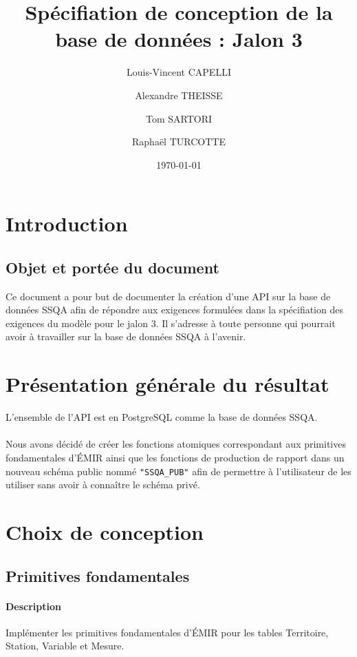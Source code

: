 \documentclass{article}
\begin{document}
\title{Spécifiation de conception de la base de données : Jalon 3}

\author{Louis-Vincent CAPELLI \and Alexandre THEISSE \and Tom SARTORI \and Raphaël TURCOTTE}
\date{\today}
\maketitle
\newpage

\tableofcontents
\newpage

\section{Introduction}
\subsection*{Objet et portée du document}
Ce document a pour but de documenter la création d'une API sur la base de données
SSQA afin de répondre aux exigences formulées dans la
spécifiation des exigences du modèle pour le jalon 3.
Il s'adresse à toute personne qui pourrait avoir à travailler sur la base de données
SSQA à l'avenir.

\section{Présentation générale du résultat}
L'ensemble de l'API est en PostgreSQL comme la base de données SSQA.
\\\\
Nous avons décidé de créer les fonctions atomiques correspondant aux primitives 
fondamentales d'ÉMIR ainsi que les fonctions de production de rapport
dans un nouveau schéma public nommé \texttt{"SSQA\_PUB"}
afin de permettre à l'utilisateur de les utiliser sans avoir à connaître le
schéma privé.


\section{Choix de conception}
\subsection{Primitives fondamentales}
\paragraph{Description} Implémenter les primitives fondamentales d'ÉMIR
pour les tables Territoire, Station, Variable et Mesure.
\end{document}

